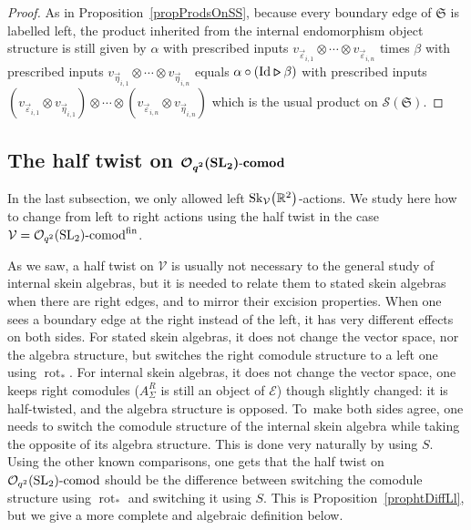 \documentclass[pdftex]{sigma}%
\numberwithin{equation}{section}
\newcommand{\bmrhd}{\bm{\triangleright}}
\newcommand{\Oqcomfin}{\Oq\text{-}{\rm comod}^{\rm fin}}
\newcommand{\Oqcom}{\Oq\text{-}{\rm comod}}
\newcommand{\Oq}{\mathcal{O}_{q^2}({\rm SL}_2)}
\begin{document}
\begin{proof}
As in Proposition~\ref{propProdsOnSS}, because every boundary edge of $\mathfrak{S}$ is labelled left, the product inherited from the internal endomorphism object structure is still given by $\alpha$ with prescribed inputs $v_{\vec{\varepsilon}_{i,1}}\otimes\cdots\otimes v_{\vec{\varepsilon}_{i,n}}$ times $\beta$ with prescribed inputs $v_{\vec{\eta}_{i,1}}\otimes\cdots\otimes v_{\vec{\eta}_{i,n}}$ equals $\alpha \circ ({\rm Id} \bmrhd \beta)$ with prescribed inputs $(v_{\vec{\varepsilon}_{i,1}}\otimes v_{\vec{\eta}_{i,1}})\otimes\cdots\otimes (v_{\vec{\varepsilon}_{i,n}}\otimes v_{\vec{\eta}_{i,n}})$ which is the usual product on $\mathscr{S}(\mathfrak{S})$.
\end{proof}


\subsection[The half twist on O\_\{q\textasciicircum{}2\}(SL\_2)-comod]{The half twist on $\boldsymbol{\Oq\text{-}{\rm comod}}$}

In the last subsection, we only allowed left ${\rm Sk}_\mathcal{V}\big(\mathbb{R}^2\big)$-actions. We study here how to change from left to right actions using the half twist in the case $\mathcal{V} = \Oqcomfin$.
\begin{Remark}
As we saw, a half twist on $\mathcal{V}$ is usually not necessary to the general study of internal skein algebras, but it is needed to relate them to stated skein algebras when there are right edges, and to mirror their excision properties.
When one sees a boundary edge at the right instead of the left, it has very different effects on both sides. For stated skein algebras, it does not change the vector space, nor the algebra structure, but switches the right comodule structure to a left one using $\operatorname{rot}_*$. For internal skein algebras, it does not change the vector space, one keeps right comodules ($A_\Sigma^R$ is still an object of $\mathcal{E}$) though slightly changed: it is half-twisted, and the algebra structure is opposed. To~make both sides agree, one needs to switch the comodule structure of the internal skein algebra while taking the opposite of its algebra structure. This is done very naturally by using $S$. Using the other known comparisons, one gets that the half twist on $\Oqcom$ should be the difference between switching the comodule structure using $\operatorname{rot}_*$ and switching it using $S$. This is Proposition~\ref{prophtDiffLl}, but we give a more complete and algebraic definition below.
\end{Remark}
\end{document}
